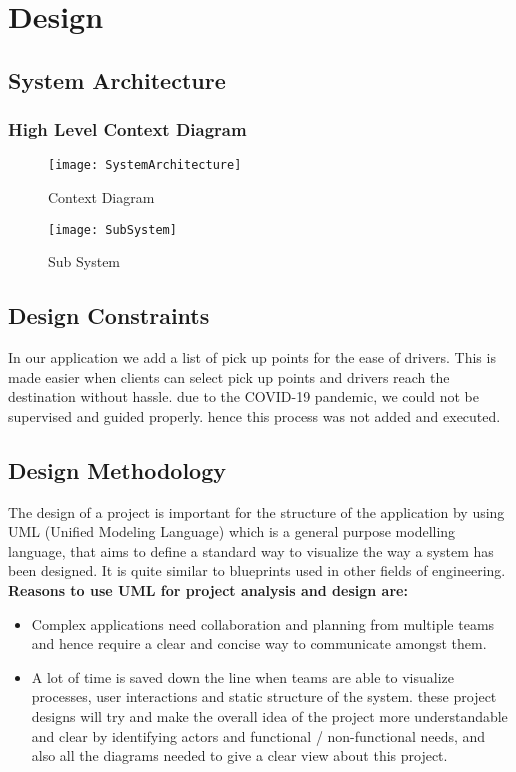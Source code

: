 \chapter{Design} \label{chap:design}

\section{System Architecture}
  
\subsection{High Level Context Diagram}
\begin{figure}[ht]
\center
\texttt{[image: SystemArchitecture]}
\caption{Context Diagram}
\label{fig:Context Diagram}
\end{figure}
\begin{figure}[ht]
\center
\texttt{[image: SubSystem]}
\caption{Sub System}
\label{fig:SubSystem}
\end{figure}

\section{Design Constraints} 
In our application we add a list of pick up points for the ease of drivers. This is made easier when clients can select pick up points and drivers reach the destination without hassle. due to the COVID-19 pandemic, we could not be supervised and guided properly. hence this process was not added and executed.
\section{Design Methodology}
The design of a project is important for the structure of the application by using UML (Unified Modeling Language) which is a general purpose modelling language, that aims to define a standard way to visualize the way a system has been designed. It is quite similar to blueprints used in other fields of engineering.
\\ \textbf{Reasons to use UML for project analysis and design are:} 

\begin{itemize}
\item Complex applications need collaboration and planning from multiple teams and hence require a clear and concise way to communicate amongst them.
\item A lot of time is saved down the line when teams are able to visualize processes, user interactions and static structure of the system. these project designs will try and make the overall idea of the project more understandable and clear by identifying actors and functional / non-functional needs, and also all the diagrams needed to give a clear view about this project.

\end{itemize}
